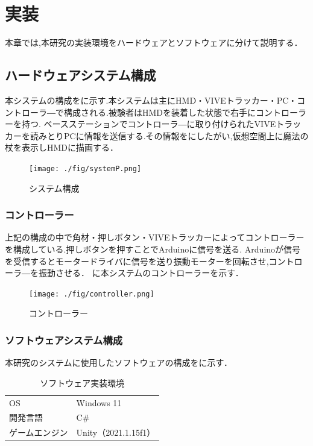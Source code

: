 \chapter{実装}
本章では,本研究の実装環境をハードウェアとソフトウェアに分けて説明する．

\section{ハードウェアシステム構成}
本システムの構成をに示す.本システムは主にHMD・VIVEトラッカー・PC・コントローラ―で構成される.被験者はHMDを装着した状態で右手にコントローラーを持つ.
ベースステーションでコントローラ―に取り付けられたVIVEトラッカーを読みとりPCに情報を送信する.その情報をにしたがい,仮想空間上に魔法の杖を表示しHMDに描画する．

\begin{figure}[h]
\centering
\texttt{[image: ./fig/systemP.png]}
\caption{システム構成}\label{sys}
\end{figure}

\newpage

\subsection{コントローラー}
上記の構成の中で角材・押しボタン・VIVEトラッカーによってコントローラーを構成している.押しボタンを押すことでArduinoに信号を送る.
Arduinoが信号を受信するとモータードライバに信号を送り振動モーターを回転させ,コントローラ―を振動させる．
に本システムのコントローラーを示す．

\begin{figure}[h]
\centering
\texttt{[image: ./fig/controller.png]}
\caption{コントローラー}\label{controller}
\end{figure}






\subsection{ソフトウェアシステム構成}
本研究のシステムに使用したソフトウェアの構成をに示す．

\begin{table}[H]
    \caption{\label{tab;software}ソフトウェア実装環境}
    \centering
    \begin{tabular}{l|l}
    \hline
    \hline
    OS & Windows 11\\
    開発言語 & C\#\\
    ゲームエンジン & Unity（2021.1.15f1）\\
    \hline
    \end{tabular}
\end{table}

